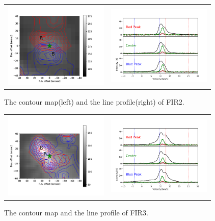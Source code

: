 \documentclass[twoside,11pt]{gshs_thesis}
\begin{document}
\begin{figure}[h!]
	\begin{center}
		\begin{tabular}{cc}
			\includegraphics[width=5cm]{Orion_12CO2-1_FIR2_rbcontour_400_modified.png} &   \includegraphics[width=5cm]{Orion_12CO2-1_FIR2_line_profile_400.png} \\
		\end{tabular}
		\caption{The contour map(left) and the line profile(right) of FIR2. }
	\end{center}
\end{figure}

\begin{figure}[h!]
	\begin{center}
		\begin{tabular}{cc}
			\includegraphics[width=5cm]{Orion_12CO2-1_FIR3_rbcontour_400_modified.png} &   \includegraphics[width=5cm]{Orion_12CO2-1_FIR3_line_profile_400.png}\\
		\end{tabular}
		\caption{The contour map and the line profile of FIR3. }
	\end{center}
\end{figure}
\end{document}
